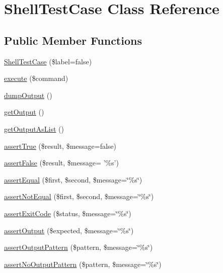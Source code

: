 \hypertarget{class_shell_test_case}{
\section{ShellTestCase Class Reference}
\label{class_shell_test_case}
}
\subsection*{Public Member Functions}
\begin{DoxyCompactItemize}
\item 
\hyperlink{class_shell_test_case_a9c5fa9fa230ab68848e100848c9cf24a}{ShellTestCase} (\$label=false)
\item 
\hyperlink{class_shell_test_case_a5ec49777fe58eba848d0d2db0f7ac98a}{execute} (\$command)
\item 
\hyperlink{class_shell_test_case_ac2d50f283cda194f94336bbcfd5e9007}{dumpOutput} ()
\item 
\hyperlink{class_shell_test_case_a92137846850cac08f6840b6def2d8f22}{getOutput} ()
\item 
\hyperlink{class_shell_test_case_a53847d86f26b9ffc12f030041628bcd9}{getOutputAsList} ()
\item 
\hyperlink{class_shell_test_case_adbfc654af0d720171eaebdf48324df1a}{assertTrue} (\$result, \$message=false)
\item 
\hyperlink{class_shell_test_case_a5457ff8ac3d1832fc34f8cae2e82fb5d}{assertFalse} (\$result, \$message= '\%s')
\item 
\hyperlink{class_shell_test_case_a9cfcfcb3b0516f335ce01944a2fdf0b4}{assertEqual} (\$first, \$second, \$message=\char`\"{}\%s\char`\"{})
\item 
\hyperlink{class_shell_test_case_a37aa31741b2d5fc1aac150efa0339bbf}{assertNotEqual} (\$first, \$second, \$message=\char`\"{}\%s\char`\"{})
\item 
\hyperlink{class_shell_test_case_a6d3b93005e0dd60d768c65f5b2f813c6}{assertExitCode} (\$status, \$message=\char`\"{}\%s\char`\"{})
\item 
\hyperlink{class_shell_test_case_a9961443a5439f183fad382d7a814ed61}{assertOutput} (\$expected, \$message=\char`\"{}\%s\char`\"{})
\item 
\hyperlink{class_shell_test_case_aa9bd5bb426cae9cf49bc36994c6b0d78}{assertOutputPattern} (\$pattern, \$message=\char`\"{}\%s\char`\"{})
\item 
\hyperlink{class_shell_test_case_ac00b2d0b2f8a37998e2ffbe16ea286e4}{assertNoOutputPattern} (\$pattern, \$message=\char`\"{}\%s\char`\"{})

\end{DoxyCompactItemize}
